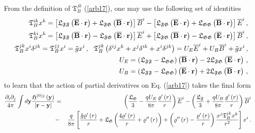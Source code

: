\documentclass[12pt]{article}
\begin{document}
\begin{appendices}
From the definition of $\mathfrak{T}_{B}^{jk}$ (\ref{arb17}), one may use
the following set of identities%
\begin{eqnarray}
&&\mathfrak{T}_{B}^{ik}x^{k}=\left[ \mathfrak{L}_{\mathfrak{FF}}\left( 
\overline{\mathbf{E}}\cdot \mathbf{r}\right) +\mathfrak{L}_{\mathfrak{FG}%
}\left( \mathbf{\overline{B}}\cdot \mathbf{r}\right) \right] \overline{B}%
^{i}-\left[ \mathfrak{L}_{\mathfrak{FG}}\left( \overline{\mathbf{E}}\cdot 
\mathbf{r}\right) +\mathfrak{L}_{\mathfrak{GG}}\left( \mathbf{\overline{B}}%
\cdot \mathbf{r}\right) \right] \overline{E}^{i}\,,  \notag \\
&&\mathfrak{T}_{B}^{ki}x^{k}=\left[ \mathfrak{L}_{\mathfrak{FF}}\left( 
\mathbf{\overline{B}}\cdot \mathbf{r}\right) -\mathfrak{L}_{\mathfrak{FG}%
}\left( \overline{\mathbf{E}}\cdot \mathbf{r}\right) \right] \overline{E}%
^{i}+\left[ \mathfrak{L}_{\mathfrak{FG}}\left( \mathbf{\overline{B}}\cdot 
\mathbf{r}\right) -\mathfrak{L}_{\mathfrak{GG}}\left( \overline{\mathbf{E}}%
\cdot \mathbf{r}\right) \right] \overline{B}^{i}\,,  \notag \\
&&\mathfrak{T}_{B}^{jk}x^{i}\delta ^{jk}=\mathfrak{T}_{B}^{jj}x^{i}=\tilde{g}%
x^{i}\,,\ \ \mathfrak{T}_{B}^{jk}\left( \delta ^{ij}x^{k}+x^{j}\delta
^{ik}+x^{i}\delta ^{jk}\right) =U_{E}\overline{E}^{i}+U_{B}\overline{B}^{i}+%
\tilde{g}x^{i}\,,  \notag \\
&&U_{E}=\left( \mathfrak{L}_{\mathfrak{FF}}-\mathfrak{L}_{\mathfrak{GG}%
}\right) \left( \mathbf{\overline{B}}\cdot \mathbf{r}\right) -2\mathfrak{L}_{%
\mathfrak{FG}}\left( \overline{\mathbf{E}}\cdot \mathbf{r}\right) \,,  \notag
\\
&&U_{B}=\left( \mathfrak{L}_{\mathfrak{FF}}-\mathfrak{L}_{\mathfrak{GG}%
}\right) \left( \overline{\mathbf{E}}\cdot \mathbf{r}\right) +2\mathfrak{L}_{%
\mathfrak{FG}}\left( \mathbf{\overline{B}}\cdot \mathbf{r}\right) \,,
\label{arb18}
\end{eqnarray}%
to learn that the action of partial derivatives on Eq. (\ref{arb17}) takes
the final form%
\begin{eqnarray}
\frac{\partial _{i}\partial _{j}}{4\pi }\int d\mathbf{y}\frac{\mathfrak{H}%
^{\left( 0\right) j}\left( \mathbf{y}\right) }{\left\vert \mathbf{r-y}%
\right\vert } &=&\left( \frac{\mathfrak{L}_{\mathfrak{G}}}{3}-\frac{qU_{E}}{%
8\pi }\frac{\varrho ^{\prime }\left( r\right) }{r}\right) \overline{E}%
^{i}-\left( \frac{\mathfrak{L}_{\mathfrak{F}}}{3}+\frac{qU_{B}}{8\pi }\frac{%
\varrho ^{\prime }\left( r\right) }{r}\right) \overline{B}^{i}  \notag \\
&-&\frac{q}{8\pi }\left[ \frac{\tilde{g}\varrho ^{\prime }\left( r\right) }{r%
}+\mathfrak{L}_{\mathfrak{G}}\left( \frac{4\varrho ^{\prime }\left( r\right) 
}{r}+\varrho ^{\prime \prime }\left( r\right) \right) +\left( \varrho
^{\prime \prime }\left( r\right) -\frac{\varrho ^{\prime }\left( r\right) }{r%
}\right) \frac{x^{j}\mathfrak{T}_{B}^{jk}x^{k}}{r^{2}}\right] x^{i}\,.
\label{arb19}
\end{eqnarray}


\end{appendices}
\end{document}
